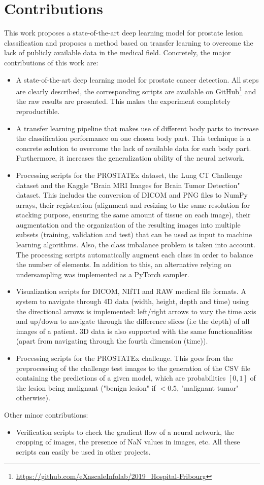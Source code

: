 \section{Contributions}
This work proposes a state-of-the-art deep learning model for prostate lesion classification and proposes a method based on transfer learning to overcome the lack of publicly available data in the medical field. Concretely, the major contributions of this work are:
\begin{itemize}
\item A state-of-the-art deep learning model for prostate cancer detection. All steps are clearly described, the corresponding scripts are available on GitHub\footnote{\url{https://github.com/eXascaleInfolab/2019_Hospital-Fribourg}} and the raw results are presented. This makes the experiment completely reproductible. 

\item A transfer learning pipeline that makes use of different body parts to increase the classification performance on one chosen body part. This technique is a concrete solution to overcome the lack of available data for each body part. Furthermore, it increases the generalization ability of the neural network.


\item Processing scripts for the PROSTATEx dataset, the Lung CT Challenge dataset and the Kaggle "Brain MRI Images for Brain Tumor Detection" dataset. This includes the conversion of DICOM and PNG files to NumPy arrays, their registration (alignment and resizing to the same resolution for stacking purpose, ensuring the same amount of tissue on each image), their augmentation and the organization of the resulting images into multiple subsets (training, validation and test) that can be used as input to machine learning algorithms. Also, the class imbalance problem is taken into account. The processing scripts automatically augment each class in order to balance the number of elements. In addition to this, an alternative relying on undersampling was implemented as a PyTorch sampler.

\item Visualization scripts for DICOM, NIfTI and RAW medical file formats. A system to navigate through 4D data (width, height, depth and time) using the directional arrows is implemented: left/right arrows to vary the time axis and up/down to navigate through the difference slices (i.e the depth) of all images of a patient. 3D data is also supported with the same functionalities (apart from navigating through the fourth dimension (time)). 


\item Processing scripts for the PROSTATEx challenge. This goes from the preprocessing of the challenge test images to the generation of the CSV file containing the predictions of a given model, which are probabilities $[0,1]$ of the lesion being malignant ("benign lesion" if $< 0.5$, "malignant tumor" otherwise).

\end{itemize}
Other minor contributions:
\begin{itemize}
\item Verification scripts to check the gradient flow of a neural network, the cropping of images, the presence of NaN values in images, etc. All these scripts can easily be used in other projects.
\end{itemize}